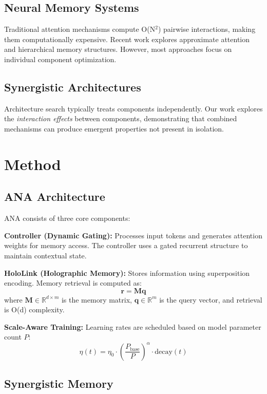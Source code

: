\documentclass[10pt]{article}
\begin{document}
\subsection{Neural Memory Systems}
Traditional attention mechanisms compute O(N$^2$) pairwise interactions, making them computationally expensive. Recent work explores approximate attention and hierarchical memory structures. However, most approaches focus on individual component optimization.

\subsection{Synergistic Architectures}
Architecture search typically treats components independently. Our work explores the \textit{interaction effects} between components, demonstrating that combined mechanisms can produce emergent properties not present in isolation.

\section{Method}

\subsection{ANA Architecture}

ANA consists of three core components:

\textbf{Controller (Dynamic Gating):} Processes input tokens and generates attention weights for memory access. The controller uses a gated recurrent structure to maintain contextual state.

\textbf{HoloLink (Holographic Memory):} Stores information using superposition encoding. Memory retrieval is computed as:
\begin{equation}
\mathbf{r} = \mathbf{M}\mathbf{q}
\end{equation}
where $\mathbf{M} \in \mathbb{R}^{d \times m}$ is the memory matrix, $\mathbf{q} \in \mathbb{R}^{m}$ is the query vector, and retrieval is O(d) complexity.

\textbf{Scale-Aware Training:} Learning rates are scheduled based on model parameter count $P$:
\begin{equation}
\eta(t) = \eta_0 \cdot \left(\frac{P_{\text{base}}}{P}\right)^\alpha \cdot \text{decay}(t)
\end{equation}

\subsection{Synergistic Memory}
\end{document}
